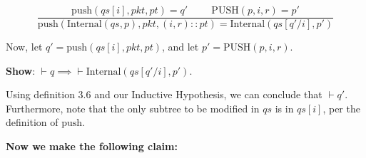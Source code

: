 \documentclass{article}
\begin{document}
$$\frac{\text{push}(qs[i], pkt, pt) = q' \hspace{1cm} \text{PUSH}(p, i, r) = p'}{\text{push}(\text{Internal}(qs, p), pkt, (i, r) :: pt) = \text{Internal}(qs[q'/i], p')}$$\newline

\noindent Now, let $q' = \text{push}(qs[i], pkt, pt)$, and let $p' = \text{PUSH}(p, i, r)$.\newline

\noindent \textbf{Show}: $\vdash q \implies \vdash \text{Internal}(qs[q'/i], p')$.\newline

\noindent Using definition 3.6 and our Inductive Hypothesis, we can conclude that $\vdash q'$. Furthermore, note that the only subtree to be modified in $qs$ is in $qs[i]$, per the definition of $\text{push}$.\newline

\noindent \textbf{Now we make the following claim:}\\[-20pt]
\end{document}

